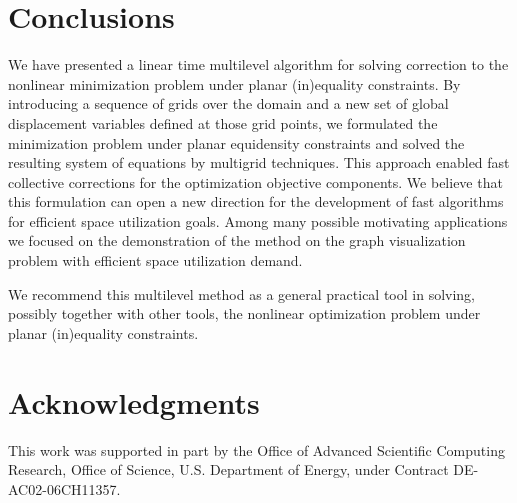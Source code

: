 \documentclass[final]{siamltex}
\begin{document}
\section{Conclusions}\label{future-work}

\par We have presented a linear time multilevel algorithm
for solving correction to the nonlinear minimization problem
under planar (in)equality constraints. By introducing a sequence
of grids over the domain and a new set of global displacement
variables defined at those grid points, we formulated the
minimization problem under planar equidensity constraints and
solved the resulting system of equations by multigrid techniques.
This approach enabled fast collective corrections for the optimization
objective components. We believe that this formulation can open a
new direction for the development of fast algorithms for efficient
space utilization goals. Among many possible motivating
applications
\cite{gd-book,eades1984,harel88,harelinger,dreznerfacility,meguerdichian01coverage,
cardei-energyefficient, citeulike:717044,vlsi2007book} we focused
on the demonstration of the method on the graph visualization
problem with efficient space utilization demand.
\par We recommend this multilevel method as a general practical
tool in solving, possibly together with other tools, the
nonlinear optimization problem under planar (in)equality
constraints.


\section{Acknowledgments}
\par This work was supported in part by the Office of Advanced Scientific Computing Research, Office of Science, U.S. Department of Energy, under Contract DE-AC02-06CH11357.

\end{document}
